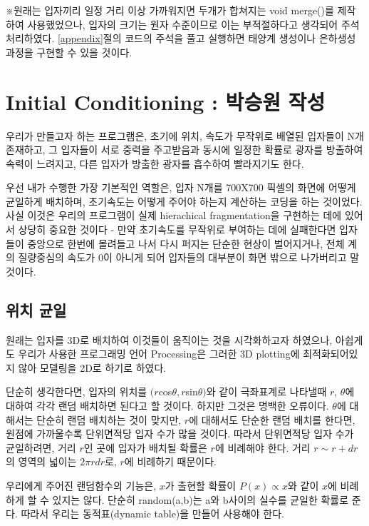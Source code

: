 \documentclass{gshs-hutech}
\begin{document}
※원래는 입자끼리 일정 거리 이상 가까워지면 두개가 합쳐지는 void merge()를 제작하여 사용했었으나, 입자의 크기는 원자 수준이므로 이는 부적절하다고 생각되어 주석 처리하였다. \ref{appendix}절의 코드의 주석을 풀고 실행하면 태양계 생성이나 은하생성 과정을 구현할 수 있을 것이다. 


\section{Initial Conditioning : 박승원 작성}
우리가 만들고자 하는 프로그램은, 초기에 위치, 속도가 무작위로 배열된 입자들이 N개 존재하고, 그 입자들이 서로 중력을 주고받음과 동시에 일정한 확률로 광자를 방출하여 속력이 느려지고, 다른 입자가 방출한 광자를 흡수하여 빨라지기도 한다.

우선 내가 수행한 가장 기본적인 역할은, 입자 N개를 700X700 픽셀의 화면에 어떻게 균일하게 배치하며, 초기속도는 어떻게 주어야 하는지 계산하는 코딩을 하는 것이었다. 사실 이것은 우리의 프로그램이 실제 hierachical fragmentation을 구현하는 데에 있어서 상당히 중요한 것이다 - 만약 초기속도를 무작위로 부여하는 데에 실패한다면 입자들이 중앙으로 한번에 몰려들고 나서 다시 퍼지는 단순한 현상이 벌어지거나, 전체 계의 질량중심의 속도가 0이 아니게 되어 입자들의 대부분이 화면 밖으로 나가버리고 말 것이다. 


\subsection{위치 균일}

원래는 입자를 3D로 배치하여 이것들이 움직이는 것을 시각화하고자 하였으나, 아쉽게도 우리가 사용한 프로그래밍 언어 Processing은 그러한 3D plotting에 최적화되어있지 않아 모델링을 2D로 하기로 하였다.

단순히 생각한다면, 입자의 위치를 $(r$cos$\theta,r$sin$\theta)$와 같이 극좌표계로 나타낼때 $r$, $\theta$에 대하여 각각 랜덤 배치하면 된다고 할 것이다. 하지만 그것은 명백한 오류이다. $\theta$에 대해서는 단순히 랜덤 배치하는 것이 맞지만, 
$r$에 대해서도 단순한 랜덤 배치를 한다면, 원점에 가까울수록 단위면적당 입자 수가 많을 것이다. 따라서 단위면적당 입자 수가 균일하려면, 거리 $r$인 곳에 입자가 배치될 확률은 $r$에 비례해야 한다. 거리 $r \sim r+dr$의 영역의 넓이는 $2\pi rdr$로, $r$에 비례하기 때문이다. 

우리에게 주어진 랜덤함수의 기능은, $x$가 출현할 확률이 $P(x)\propto x$와 같이 
$x$에 비례하게 할 수 있지는 않다. 단순히 random(a,b)는 a와 b사이의 실수를 균일한 확률로 준다. 따라서 우리는 동적표(dynamic table)을 만들어 사용해야 한다.
\end{document}
